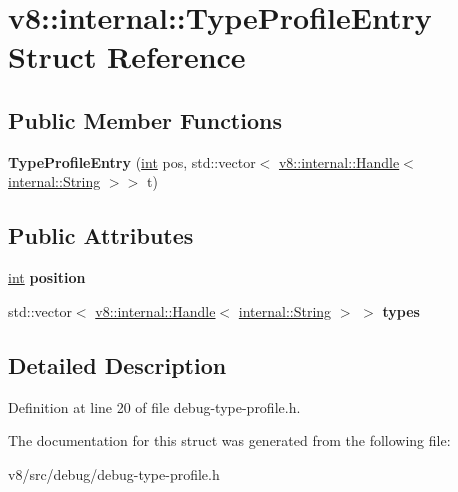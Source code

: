 \hypertarget{structv8_1_1internal_1_1TypeProfileEntry}{}\section{v8\+:\+:internal\+:\+:Type\+Profile\+Entry Struct Reference}
\label{structv8_1_1internal_1_1TypeProfileEntry}
\subsection*{Public Member Functions}
\begin{DoxyCompactItemize}
\item 
\mbox{\label{structv8_1_1internal_1_1TypeProfileEntry_af535e5be53f12b0cf75f6a9e62f58f1c}} 
{\bfseries Type\+Profile\+Entry} (\mbox{\hyperlink{classint}{int}} pos, std\+::vector$<$ \mbox{\hyperlink{classv8_1_1internal_1_1Handle}{v8\+::internal\+::\+Handle}}$<$ \mbox{\hyperlink{classv8_1_1internal_1_1String}{internal\+::\+String}} $>$$>$ t)
\end{DoxyCompactItemize}
\subsection*{Public Attributes}
\begin{DoxyCompactItemize}
\item 
\mbox{\label{structv8_1_1internal_1_1TypeProfileEntry_ad31dffef8346a0d1a43c59d6b76228e8}} 
\mbox{\hyperlink{classint}{int}} {\bfseries position}
\item 
\mbox{\label{structv8_1_1internal_1_1TypeProfileEntry_a986e68c2f5c5fa0d03065368b5f23fc4}} 
std\+::vector$<$ \mbox{\hyperlink{classv8_1_1internal_1_1Handle}{v8\+::internal\+::\+Handle}}$<$ \mbox{\hyperlink{classv8_1_1internal_1_1String}{internal\+::\+String}} $>$ $>$ {\bfseries types}
\end{DoxyCompactItemize}


\subsection{Detailed Description}


Definition at line 20 of file debug-\/type-\/profile.\+h.



The documentation for this struct was generated from the following file\+:\begin{DoxyCompactItemize}
\item 
v8/src/debug/debug-\/type-\/profile.\+h\end{DoxyCompactItemize}
